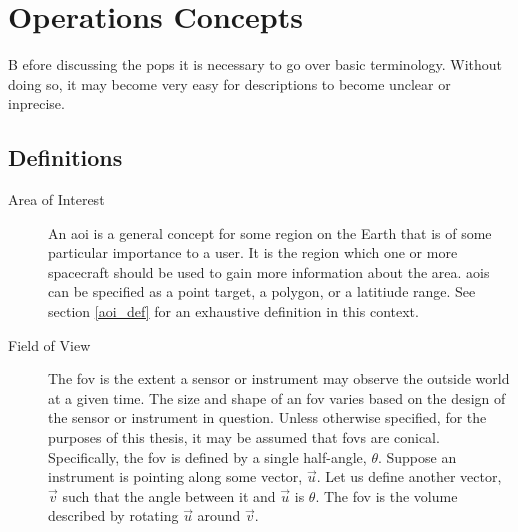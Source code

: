 \glsresetall{} 
\chapter{Operations Concepts}

\lettrine[lines=2, findent=0pt, nindent=5pt]{B}{} efore discussing the
\gls{pops} it is necessary to go over basic terminology.  Without doing so, it
may become very easy for descriptions to become unclear or inprecise.

\section{Definitions}

\begin{description} 

    \item[Area of Interest] An \gls{aoi} is a general concept for some region
	on the Earth that is of some particular importance to a user. It is the
	region which one or more spacecraft should be used to gain more
	information about the area. \glspl{aoi} can be specified as a point
	target, a polygon, or a latitiude range. See section \ref{aoi_def} for
	an exhaustive definition in this context. 

    \item[Field of View] The \gls{fov} is the extent a sensor or instrument may
	observe the outside world at a given time. The size and shape of an
	\gls{fov} varies based on the design of the sensor or instrument in
	question. Unless otherwise specified, for the purposes of this thesis,
	it may be assumed that \glspl{fov} are conical. Specifically, the
	\gls{fov} is defined by a single half-angle, $\theta$. Suppose an
	instrument is pointing along some vector, $\vec{u}$. Let us define
	another vector, $\vec{v}$ such that the angle between it and $\vec{u}$
	is $\theta$. The \gls{fov} is the volume described by rotating
	$\vec{u}$ around $\vec{v}$.


\end{description}
